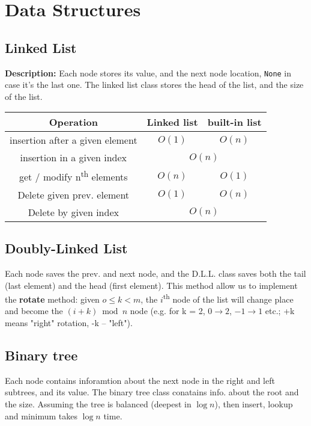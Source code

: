 \documentclass[]{article}
\newcommand\ts    {\textsuperscript}
\newcommand\fortitle[1] {\Large #1 \normalsize}
\begin{document}
	\section{\fortitle{Data Structures}}
	\begin{multicols}{2}
		
		\subsection{Linked List}
		\textbf{Description: }Each node stores its value, and the next node location, \texttt{None} in case it's the last one. The linked list class stores the head of the list, and the size of the list. 
		\begin{center}
			\begin{tabular}{|c|c|c|} 
				\hline Operation & Linked list & built-in list \\ 
				\hline insertion after a given element & $ O(1) $ & \color{deepred}$ O(n) $ \\
				\hline insertion in a given index & \multicolumn{2}{c|}{$ O(n) $} \\
				\hline get / modify n\ts{th} elements & \color{deepred}$ O(n) $ & $ O(1) $ \\
				\hline Delete given prev. element & $ O(1) $ & \color{deepred}$ O(n) $ \\
				\hline Delete by given index & \multicolumn{2}{c|}{\color{deepred}$ O(n) $} \\
				\hline
			\end{tabular}
		\end{center}
		
		\subsection{Doubly-Linked List}	
		Each node saves the prev. and next node, and the D.L.L. class saves both the tail (last element) and the head (first element). This method allow us to implement the \textbf{rotate} method: given $ o \le k < m $, the $ i $\ts{th} node of the list will change place and become the $ (i + k) \bmod n $ node (e.g. for k = 2, $ 0 \to 2 $, $ -1 \to 1 $ etc.; +k means "right" rotation, -k -- "left"). 
		
		\subsection{Binary tree}
		Each node contains inforamtion about the next node in the right and left subtrees, and its value. The binary tree class conatains info. about the root and the size. Assuming the tree is balanced (deepest in $ \log n $), then insert, lookup and minimum takes $ \log n $ time. 
		

\end{multicols}
\end{document}
